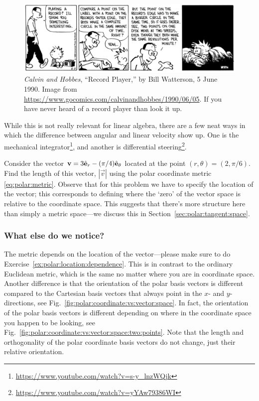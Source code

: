 \documentclass[12pt]{article}
\begin{document}
\begin{figure}[tb]
    \centering
    \includegraphics[width=\textwidth]{figures/calvin_and_hobbes_record.jpg}
    \caption{\emph{Calvin and Hobbes}, ``Record Player,'' by Bill Watterson, 5 June 1990. Image from \url{https://www.gocomics.com/calvinandhobbes/1990/06/05}. If you have never heard of a record player than look it up.}
    \label{fig:CH:record:player}
\end{figure}

\begin{example}
While this is not really relevant for linear algebra, there are a few neat ways in which the difference between angular and linear velocity show up. One is the mechanical integrator\footnote{\url{https://www.youtube.com/watch?v=s-y_lnzWQjk}}, and another is differential steering\footnote{\url{https://www.youtube.com/watch?v=yYAw79386WI}}. 
\end{example}


\begin{exercise}\label{ex:polar:location:dependence}
Consider the vector $\mathbf{v} = 3\hat{\mathbf{e}}_r - (\pi/4)\hat{\mathbf{e}}_\theta$ located at the point $(r,\theta)=(2, \pi/6)$. Find the length of this vector, $|\vec{v}|$ using the polar coordinate metric \eqref{eq:polar:metric}. Observe that for this problem we have to specify the location of the vector; this corresponds to defining where the `zero' of the vector space is relative to the coordinate space. This suggests that there's more structure here than simply a metric space---we discuss this in Section~\ref{sec:polar:tangent:space}.
\end{exercise}

\subsubsection{What else do we notice?}

The metric depends on the location of the vector---please make sure to do Exercise~\ref{ex:polar:location:dependence}. This is in contrast to the ordinary Euclidean metric, which is the same no matter where you are in coordinate space. Another difference is that the orientation of the polar basis vectors is different compared to the Cartesian basis vectors that always point in the $x$- and $y$-directions, see Fig.~\ref{fig:polar:coordinate:vs:vector:space}. In fact, the orientation of the polar basis vectors is different depending on where in the coordinate space you happen to be looking, see Fig.~\ref{fig:polar:coordinate:vs:vector:space:two:points}. Note that the length and orthogonality of the polar coordinate basis vectors do not change, just their relative orientation. 
\end{document}
